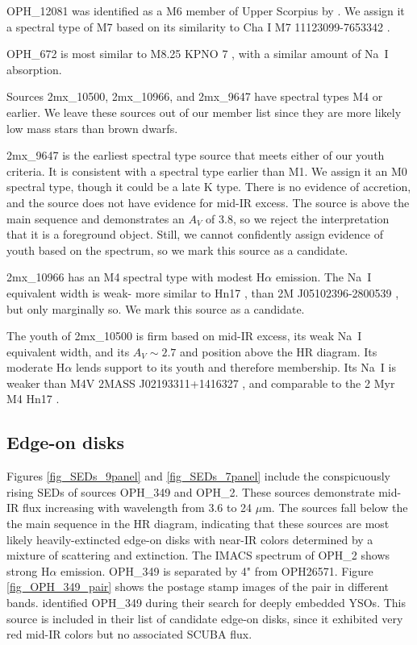OPH\_12081 was identified as a M6 member of Upper Scorpius by \citet{2006AJ....131.3016S}.  We assign it a spectral type of M7 based on its similarity to Cha I M7 11123099-7653342 \citep{2004ApJ...602..816L}.

OPH\_672 is most similar to M8.25 KPNO 7 \citep{1998AJ....115.2074B,2003ApJ...593.1093L}, with a similar amount of Na~I absorption.

Sources 2mx\_10500, 2mx\_10966, and 2mx\_9647 have spectral types M4 or earlier.  We leave these sources out of our member list since they are more likely low mass stars than brown dwarfs.

2mx\_9647 is the earliest spectral type source that meets either of our youth criteria.  It is consistent with a spectral type earlier than M1.  We assign it an M0 spectral type, though it could be a late K type.  There is no evidence of accretion, and the source does not have evidence for mid-IR excess.  The source is above the main sequence and demonstrates an $A_V$ of 3.8, so we reject the interpretation that it is a foreground object.  Still, we cannot confidently assign evidence of youth based on the spectrum, so we mark this source as a candidate.

2mx\_10966 has an M4 spectral type with modest H$\alpha$ emission.  The Na~I equivalent width is weak- more similar to Hn17 \citep{2004ApJ...602..816L}, than 2M J05102396-2800539 \citep{2007AJ....133..439C}, but only marginally so.  We mark this source as a candidate.

The youth of 2mx\_10500 is firm based on mid-IR excess, its weak Na~I equivalent width, and its $A_V\sim2.7$ and position above the HR diagram.  Its moderate H$\alpha$ lends support to its youth and therefore membership.  Its Na~I is weaker than M4V 2MASS J02193311+1416327 \citep{2003AJ....126.2421C}, and comparable to the 2 Myr M4 Hn17 \citep{2004ApJ...602..816L}.



\subsection{Edge-on disks}
Figures \ref{fig_SEDs_9panel} and \ref{fig_SEDs_7panel} include the conspicuously rising SEDs of sources OPH\_349 and OPH\_2.  These sources demonstrate mid-IR flux increasing with wavelength from 3.6 to 24 $\mu$m.  The sources fall below the the main sequence in the HR diagram, indicating that these sources are most likely heavily-extincted edge-on disks with near-IR colors determined by a mixture of scattering and extinction.  The IMACS spectrum of OPH\_2 shows strong H$\alpha$ emission.  OPH\_349 is separated by 4" from OPH26571.  Figure \ref{fig_OPH_349_pair} shows the postage stamp images of the pair in different bands.  \cite{2008ApJ...683..822J} identified OPH\_349 during their search for deeply embedded YSOs.  This source is included in their list of candidate edge-on disks, since it exhibited very red mid-IR colors but no associated SCUBA flux.


